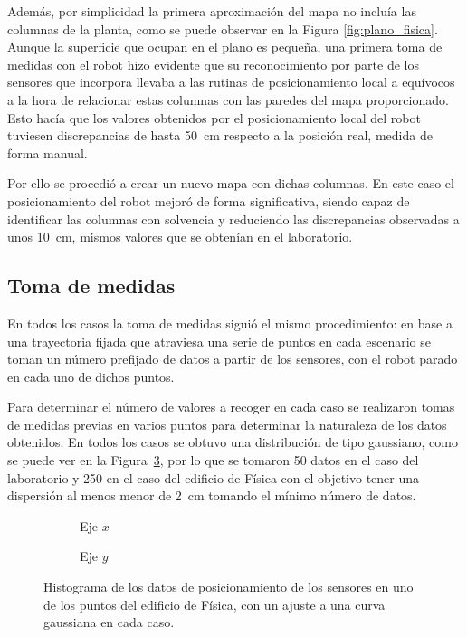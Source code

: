 Además, por simplicidad la primera aproximación del mapa no incluía las columnas de la planta, como se puede observar en la Figura \ref{fig:plano_fisica}.
Aunque la superficie que ocupan en el plano es pequeña, una primera toma de medidas con el robot hizo evidente que su reconocimiento por parte de los sensores que incorpora llevaba a las rutinas de posicionamiento local a equívocos a la hora de relacionar estas columnas con las paredes del mapa proporcionado.
Esto hacía que los valores obtenidos por el posicionamiento local del robot tuviesen discrepancias de hasta 50~cm respecto a la posición real, medida de forma manual.

Por ello se procedió a crear un nuevo mapa con dichas columnas.
En este caso el posicionamiento del robot mejoró de forma significativa, siendo capaz de identificar las columnas con solvencia y reduciendo las discrepancias observadas a unos 10~cm, mismos valores que se obtenían en el laboratorio.

\subsection{Toma de medidas}

En todos los casos la toma de medidas siguió el mismo procedimiento: en base a una trayectoria fijada que atraviesa una serie de puntos en cada escenario se toman un número prefijado de datos a partir de los sensores, con el robot parado en cada uno de dichos puntos.

Para determinar el número de valores a recoger en cada caso se realizaron tomas de medidas previas en varios puntos para determinar la naturaleza de los datos obtenidos.
En todos los casos se obtuvo una distribución de tipo gaussiano, como se puede ver en la Figura~\ref{fig:datos_sensor}, por lo que se tomaron 50 datos en el caso del laboratorio y 250 en el caso del edificio de Física con el objetivo tener una dispersión al menos menor de 2~cm tomando el mínimo número de datos.

\begin{figure}[H]
  \begin{subfigure}[b]{.5\textwidth}
    \centering
     
    \caption{Eje $x$}
    \label{fig:hist_x}
  \end{subfigure}
  \begin{subfigure}[b]{.5\textwidth}
    \centering
    
    \caption{Eje $y$}
    \label{fig:hist_y}
  \end{subfigure}
  \caption{Histograma de los datos de posicionamiento de los sensores en uno de los puntos del edificio de Física, con un ajuste a una curva gaussiana en cada caso.}
  \label{fig:datos_sensor}
\end{figure}

